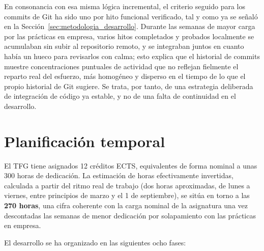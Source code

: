 En consonancia con esa misma lógica incremental, el criterio seguido para los commits de Git ha sido uno por hito funcional verificado, tal y como ya se señaló en la Sección~\ref{sec:metodologia_desarrollo}. Durante las semanas de mayor carga por las prácticas en empresa, varios hitos completados y probados localmente se acumulaban sin subir al repositorio remoto, y se integraban juntos en cuanto había un hueco para revisarlos con calma; esto explica que el historial de commits muestre concentraciones puntuales de actividad que no reflejan fielmente el reparto real del esfuerzo, más homogéneo y disperso en el tiempo de lo que el propio historial de Git sugiere. Se trata, por tanto, de una estrategia deliberada de integración de código ya estable, y no de una falta de continuidad en el desarrollo.

\section{Planificación temporal}
\label{sec:planificacion_temporal}

El TFG tiene asignados 12 créditos ECTS, equivalentes de forma nominal a unas 300 horas de dedicación. La estimación de horas efectivamente invertidas, calculada a partir del ritmo real de trabajo (dos horas aproximadas, de lunes a viernes, entre principios de marzo y el 1 de septiembre), se sitúa en torno a las \textbf{270 horas}, una cifra coherente con la carga nominal de la asignatura una vez descontadas las semanas de menor dedicación por solapamiento con las prácticas en empresa.

El desarrollo se ha organizado en las siguientes ocho fases:

